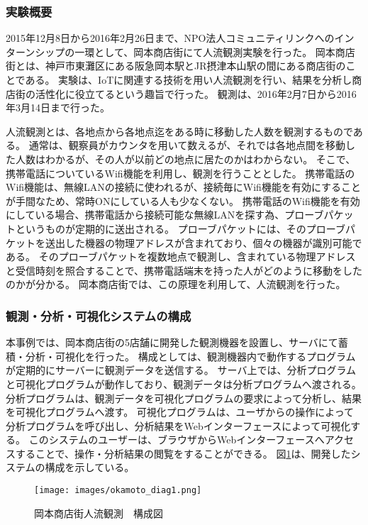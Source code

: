 \begin{comment}
IoTサービスの開発と運用における要件を引き出すために、岡本商店街での実験を行った。
・実験の概要
・開発したサービスの説明
・用いた機器や開発したプログラム等の説明
　・どのように開発したのか
\end{comment}

\subsubsection{実験概要}
2015年12月8日から2016年2月26日まで、NPO法人コミュニティリンクへのインターンシップの一環として、岡本商店街にて人流観測実験を行った。
岡本商店街とは、神戸市東灘区にある阪急岡本駅とJR摂津本山駅の間にある商店街のことである。
実験は、IoTに関連する技術を用い人流観測を行い、結果を分析し商店街の活性化に役立てるという趣旨で行った。
観測は、2016年2月7日から2016年3月14日まで行った。

人流観測とは、各地点から各地点迄をある時に移動した人数を観測するものである。
通常は、観察員がカウンタを用いて数えるが、それでは各地点間を移動した人数はわかるが、その人が以前どの地点に居たのかはわからない。
そこで、携帯電話についているWifi機能を利用し、観測を行うこととした。
携帯電話のWifi機能は、無線LANの接続に使われるが、接続毎にWifi機能を有効にすることが手間なため、常時ONにしている人も少なくない。
携帯電話のWifi機能を有効にしている場合、携帯電話から接続可能な無線LANを探す為、プローブパケットというものが定期的に送出される。
プローブパケットには、そのプローブパケットを送出した機器の物理アドレスが含まれており、個々の機器が識別可能である。
そのプローブパケットを複数地点で観測し、含まれている物理アドレスと受信時刻を照合することで、携帯電話端末を持った人がどのように移動をしたのかが分かる。
岡本商店街では、この原理を利用して、人流観測を行った。

\subsubsection{観測・分析・可視化システムの構成}
本事例では、岡本商店街の5店舗に開発した観測機器を設置し、サーバにて蓄積・分析・可視化を行った。
構成としては、観測機器内で動作するプログラムが定期的にサーバーに観測データを送信する。
サーバ上では、分析プログラムと可視化プログラムが動作しており、観測データは分析プログラムへ渡される。
分析プログラムは、観測データを可視化プログラムの要求によって分析し、結果を可視化プログラムへ渡す。
可視化プログラムは、ユーザからの操作によって分析プログラムを呼び出し、分析結果をWebインターフェースによって可視化する。
このシステムのユーザーは、ブラウザからWebインターフェースへアクセスすることで、操作・分析結果の閲覧をすることができる。
図\ref{fig:okamoto_diag1}は、開発したシステムの構成を示している。
\begin{figure}[htbp]
\texttt{[image: images/okamoto\_diag1.png]}
\caption{岡本商店街人流観測　構成図}
\label{fig:okamoto_diag1}
\end{figure}

